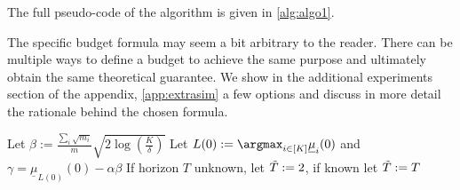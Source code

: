 The full pseudo-code of the algorithm is given in  \cref{alg:algo1}. 

\begin{remark} 
The specific budget formula may seem a bit arbitrary to the reader. There can be multiple ways to define a budget to achieve the same purpose and ultimately obtain the same theoretical guarantee. We show in the additional experiments section of the appendix, \cref{app:extrasim} a few options and discuss in more detail the rationale behind the chosen formula.
\end{remark}

\begin{algorithm}[ht]
\DontPrintSemicolon
{}
Let  $\beta:=\frac{\sum_i \sqrt{m_i}}{m}\sqrt{2\log(\frac{K}{\delta})}$\;
	Let $L(0):=\argmax_{i \in [K]}\underline{\mu}_{i}(0)$ and $\gamma= \underline{\mu}_{L(0)}(0)-\alpha\beta$\; 
 If horizon $T$ unknown, let $\Tilde{T}:=2$, if known let $\Tilde{T}:=T$\;
	\caption{\algoname} \label{alg:algo1}
\end{algorithm}

